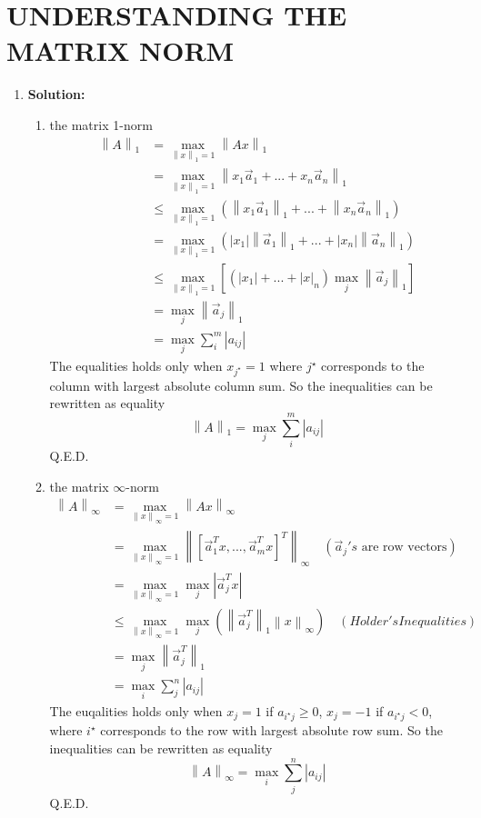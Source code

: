 \section{UNDERSTANDING THE MATRIX NORM}
\begin{enumerate}
	\item \textbf{Solution:}
	\begin{enumerate}
		\item the matrix 1-norm 
		\begin{align*}
		\left\|A\right\|_1  &=\max_{ \left\|x\right\|_1=1}  \left\|Ax\right\|_1 \\
		&=\max_{ \left\|x\right\|_1=1} \left\|x_1\vec{a}_1+...+x_n\vec{a}_n\right\|_1\\
		&\le \max_{ \left\|x\right\|_1=1} \left(\left\|x_1\vec{a}_1\right\|_1 +...+\left\|x_n\vec{a}_n\right\|_1 \right)\\
		&= \max_{ \left\|x\right\|_1=1} \left(|x_1|\left\|\vec{a}_1\right\|_1 + ...+|x_n|\left\|\vec{a}_n\right\|_1\right)\\
		&\le  \max_{ \left\|x\right\|_1=1}\left[ (|x_1|+...+|x|_n)\max_j	\left\|\vec{a}_j\right\|_1 \right]\\
		&=\max_{j} \left\|\vec{a}_j\right\|_1 \\
		&=\max_{j} \sum_{i}^m |a_{ij}|
		\end{align*}
		The equalities holds only when $x_{j^\star}=1$ where $j^\star$ corresponds to the column with largest absolute column sum. So the inequalities can be rewritten as equality
		$$\left\|A\right\|_1 = \max_{j} \sum_{i}^m |a_{ij}|$$
		Q.E.D.
		\item the matrix $\infty$-norm
		\begin{align*}
		\left\|A\right\|_\infty &= \max_{\left\|x\right\|_\infty=1} \left\|Ax\right\|_\infty\\
		&= \max_{\left\|x\right\|_\infty=1} \left\|[\vec{a}_1^Tx,...,\vec{a}_m^Tx]^T\right\|_\infty\quad(\vec{a}_j's \text{ are row vectors})\\
		&= \max_{\left\|x\right\|_\infty=1} \max_j |\vec{a}_j^Tx|\\
		&\le \max_{\left\|x\right\|_\infty=1}\max_j\left( \left\|\vec{a}_j^T\right\|_1 	\left\|x\right\|_\infty\right)\quad (Holder's Inequalities)\\
		&=\max_j \left\|\vec{a}_j^T\right\|_1\\
		&=\max_i \sum_{j}^{n}|a_{ij}|
		\end{align*}
		The euqalities holds only when $x_j=1$ if $a_{i^\star j}\ge 0$, $x_j=-1$ if $a_{i^\star j} <0$, where $i^\star$ corresponds to the row with largest absolute row sum. So the inequalities can be rewritten as equality
		$$\left\|A\right\|_\infty =\max_i \sum_{j}^{n}|a_{ij}|$$
		Q.E.D.
	\end{enumerate}
\end{enumerate}